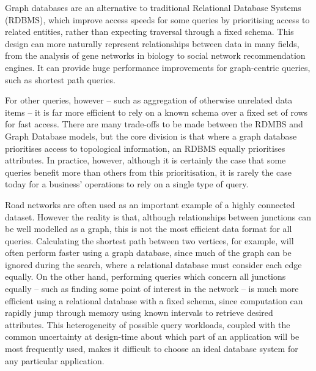 Graph databases are an alternative to traditional Relational Database Systems
(RDBMS), which improve access speeds for some queries by prioritising access to
related entities, rather than expecting traversal through a fixed schema. This
design can more naturally represent relationships between data in many fields,
from the analysis of gene networks in biology to social network recommendation
engines.  It can provide huge performance improvements for graph-centric
queries, such as shortest path queries. 

For other queries, however -- such as aggregation of otherwise unrelated data
items -- it is far more efficient to rely on a known schema over a fixed set of
rows for fast access. There are many trade-offs to be made between the RDMBS and
Graph Database models, but the core division is that where a graph database prioritises access to topological information, an RDBMS equally prioritises attributes.
In practice, however, although it is certainly the case that some queries benefit more than others from this prioritisation, it is rarely the case today for a business' operations to rely on a single type of query. 

Road networks are often used as an important example of a highly connected
dataset. However the reality is that, although relationships between junctions
can be well modelled as a graph, this is not the most efficient data format
for all queries.  Calculating the shortest path between two vertices, for
example, will often perform faster using a graph database, since much of the
graph can be ignored during the search, where a relational database must
consider each edge equally. On the other hand, performing queries which
concern all junctions equally -- such as finding some point of interest in the
network -- is much more efficient using a relational database with a fixed
schema, since computation can rapidly jump through memory using known
intervals to retrieve desired attributes. This heterogeneity of possible query
workloads, coupled with the common uncertainty at design-time about which part
of an application will be most frequently used, makes it difficult to choose
an ideal database system for any particular application.

